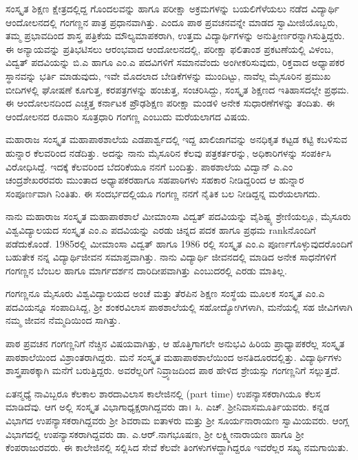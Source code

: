 {ಸಂಸ್ಕೃತ ಶಿಕ್ಷಣ ಕ್ಷೇತ್ರದಲ್ಲಿದ್ದ ಗೊಂದಲವನ್ನು ಹಾಗೂ ಪರೀಕ್ಷಾ ಅಕ್ರಮಗಳನ್ನು ಬಯಲಿಗೆಳೆಯಲು ನಡೆದ ವಿದ್ಯಾರ್ಥಿ ಆಂದೋಲನದಲ್ಲಿ ಗಂಗಣ್ಣನ ಪಾತ್ರ ಪ್ರಧಾನವಾಗಿತ್ತು. ಎಂದೂ ಪಾಠ  \enginline{-}  ಪ್ರವಚನ\-ವನ್ನೇ ಮಾಡದ ಸ್ವಾಮೀಜಿಯೊಬ್ಬರು, ತಮ್ಮ  ಪ್ರಭಾವದಿಂದ ಶಾಸ್ತ್ರ ಪತ್ರಿಕೆಯ ಮೌಲ್ಯಮಾಪಕರಾಗಿ, ಉತ್ತಮ ವಿದ್ಯಾರ್ಥಿಗಳನ್ನು ಅನುತ್ತೀರ್ಣರನ್ನಾಗಿಸುತ್ತಿದ್ದರು. 
\newpage
ಈ ಅನ್ಯಾಯವನ್ನು ಪ್ರತಿಭಟಿಸಲು ಆರಂಭವಾದ ಆಂದೋಲನದಲ್ಲಿ, ಪರೀಕ್ಷಾ ಫಲಿತಾಂಶ ಪ್ರಕಟಣೆಯಲ್ಲಿ ವಿಳಂಬ, ವಿದ್ವತ್ ಪದವಿಯನ್ನು ಬಿ.ಎ  ಹಾಗೂ  ಎಂ.ಎ ಪದವಿಗಳಿಗೆ ಸಮಾನವೆಂದು ಅಂಗೀಕರಿಸುವುದು, ರಿಕ್ತವಾದ ಅಧ್ಯಾಪಕರ ಸ್ಥಾನವನ್ನು  ಭರ್ತಿ ಮಾಡುವುದು, ಇವೇ ಮೊದಲಾದ ಬೇಡಿಕೆಗಳನ್ನು ಮುಂದಿಟ್ಟು, ನಾವೆಲ್ಲ ಮೈಸೂರಿನ ಪ್ರಮುಖ ಬೀದಿಗಳಲ್ಲಿ ಘೋಷಣೆ ಕೂಗುತ್ತ, ಕರಪತ್ರಗಳನ್ನು ಹಂಚುತ್ತ, ಸಂಚರಿಸಿದ್ದು, ಸಂಸ್ಕೃತ ಶಿಕ್ಷಣದ ಇತಿಹಾಸದಲ್ಲೇ ಪ್ರಥಮ. ಈ ಆಂದೋಲನದಿಂದ ಎಚ್ಚತ್ತ ಕರ್ನಾಟಕ ಪ್ರೌಢಶಿಕ್ಷಣ ಪರೀಕ್ಷಾ ಮಂಡಳಿ ಅನೇಕ ಸುಧಾರಣೆಗಳನ್ನು ತಂದಿತು. ಈ ಆಂದೋಲನದ ರೂವಾರಿ   \enginline{-}   ಸೂತ್ರಧಾರಿ ಗಂಗಣ್ಣ  ಎಂಬುದು ಮರೆಯಲಾಗದ ವಿಷಯ.

ಮಹಾರಾಜ ಸಂಸ್ಕೃತ ಮಹಾಪಾಠಶಾಲೆಯ ಎಡಪಾರ್ಶ್ವದಲ್ಲಿ ಇದ್ದ ಖಾಲಿಜಾಗವನ್ನು ಅನಧಿಕೃತ ಕಟ್ಟಡ ಕಟ್ಟಿ ಕಬಳಿಸುವ ಹುನ್ನಾರ ಕೆಲವರಿಂದ ನಡೆದಿತ್ತು. ಅದನ್ನು ನಾನು ಮೈಸೂರಿನ ಕೆಲವು  ಪತ್ರಕರ್ತರನ್ನು, ಅಧಿಕಾರಿಗಳನ್ನು ಸಂಪರ್ಕಿಸಿ ವಿರೋಧಿಸಿದ್ದೆ. ಇದಕ್ಕೆ ಕೆಲವರಿಂದ ಬೆದರಿಕೆಯೂ ನನಗೆ ಬಂದಿತ್ತು. ಪಾಠಶಾಲೆಯ ವಿದ್ವಾನ್ ಎ.ಎಂ ಚಂದ್ರಶೇಖರರವರು ಮುಂತಾದ ಅಧ್ಯಾಪಕರಹಾಗೂ ಸಹಪಾಠಿಗಳು ಸಹಕಾರ ನೀಡಿದ್ದರಿಂದ ಆ ಹುನ್ನಾರ ಸಂಪೂರ್ಣವಾಗಿ ನಿಂತಿತು. ಈ ಸಂದರ್ಭದಲ್ಲಿಯೂ ಗಂಗಣ್ಣ ನನಗೆ ನೈತಿಕ ಬಲ ನೀಡಿದ್ದನ್ನ ಮರೆಯಲಾಗದು.

ನಾನು ಮಹಾರಾಜ ಸಂಸ್ಕೃತ ಮಹಾಪಾಠಶಾಲೆ ಮೀಮಾಂಸಾ ವಿದ್ವತ್ ಪದವಿಯನ್ನು ವೈಶಿಷ್ಟ್ಯ ಶ್ರೇಣಿಯಲ್ಲೂ, ಮೈಸೂರು  ವಿಶ್ವವಿದ್ಯಾಲಯದ ಸಂಸ್ಕೃತ  ಎಂ.ಎ ಪದವಿಯನ್ನು ಎರಡು ಚಿನ್ನದ ಪದಕ ಹಾಗೂ ಪ್ರಥಮ  rankನೊಂದಿಗೆ ಪಡೆದುಕೊಂಡೆ. 1985ರಲ್ಲಿ ಮೀಮಾಂಸಾ ವಿದ್ವತ್ ಹಾಗೂ 1986 ರಲ್ಲಿ ಸಂಸ್ಕೃತ ಎಂ.ಎ ಪೂರ್ಣಗೊಳ್ಳುವುದರೊಂದಿಗೆ ಬಹುತೇಕ ನನ್ನ ವಿದ್ಯಾರ್ಥಿಜೀವನ ಸಮಾಪ್ತವಾಗಿತ್ತು. ನಾನು ವಿದ್ಯಾರ್ಥಿ ಜೀವನದಲ್ಲಿ ಮಾಡಿದ ಅನೇಕ ಸಾಧನೆಗಳಿಗೆ ಗಂಗಣ್ಣನ ಬೆಂಬಲ ಹಾಗೂ ಮಾರ್ಗದರ್ಶನ ದಾರಿದೀಪವಾಗಿತ್ತು ಎಂಬುದರಲ್ಲಿ ಎರಡು ಮಾತಿಲ್ಲ.

ಗಂಗಣ್ಣನೂ ಮೈಸೂರು ವಿಶ್ವವಿದ್ಯಾಲಯದ ಅಂಚೆ ಮತ್ತು ತೆರಪಿನ ಶಿಕ್ಷಣ ಸಂಸ್ಥೆಯ ಮೂಲಕ ಸಂಸ್ಕೃತ ಎಂ.ಎ ಪದವಿಯನ್ನೂ ಸಂಪಾದಿಸಿದ್ದ, ಶ್ರೀ ಶಂಕರವಿಲಾಸ ಪಾಠಶಾಲೆಯಲ್ಲಿ ಸಹೋದ್ಯೋಗಿಗಳಾಗಿ, ಮನೆಯಲ್ಲಿ ಸಹ ಜೀವಿಗಳಾಗಿ ನಮ್ಮ ಜೀವನ ನೆಮ್ಮದಿಯಿಂದ ಸಾಗಿತ್ತು.

ಪಾಠ  \enginline{-}  ಪ್ರವಚನ ಗಂಗಣ್ಣನಿಗೆ ನೆಚ್ಚಿನ ವಿಷಯವಾಗಿತ್ತು, ಆ ಹೊತ್ತಿಗಾಗಲೇ ಅನುಭವಿ  ಹಿರಿಯ ಪ್ರಾಧ್ಯಾಪಕರೆಲ್ಲ ಸಂಸ್ಕೃತ  ಪಾಠಶಾಲೆಯಿಂದ ವಿಶ್ರಾಂತರಾಗಿದ್ದರು. ಮನೆ ಸಂಸ್ಕೃತ ಮಹಾಪಾಠಶಾಲೆಯಿಂದ ಅನತಿದೂರದಲ್ಲಿತ್ತು. ವಿದ್ಯಾರ್ಥಿಗಳು ಶಾಸ್ತ್ರಪಾಠಕ್ಕಾಗಿ ಮನೆಗೆ ಬರುತ್ತಿದ್ದರು. ಅವರೆಲ್ಲರಿಗೆ ನಿವ್ರ್ಯಾಜದಿಂದ ಪಾಠ ಹೇಳಿದ ಶ್ರೇಯಸ್ಸು ಗಂಗಣ್ಣನಿಗೆ ಸಲ್ಲುತ್ತದೆ.

ಏತನ್ಮಧ್ಯೆ ನಾವಿಬ್ಬರೂ ಕೆಲಕಾಲ ಶಾರದಾವಿಲಾಸ ಕಾಲೇಜಿನಲ್ಲಿ (part  \enginline{-}  time) ಉಪನ್ಯಾಸಕರಾಗಿಯೂ ಕೆಲಸ ಮಾಡಿದೆವು. ಆಗ ಅಲ್ಲಿ ಸಂಸ್ಕೃತ ವಿಭಾಗಾಧ್ಯಕ್ಷರಾಗಿದ್ದವರು ಡಾ। ಸಿ. ಎಚ್. ಶ್ರೀನಿವಾಸಮೂರ್ತಿಯವರು. ಕನ್ನಡ ವಿಭಾಗದ ಉಪನ್ಯಾಸಕರಾಗಿದ್ದವರು ಶ್ರೀ ಶಿವರಾಮ ಐತಾಳರು ಮತ್ತು ಶ್ರೀ ಸೂರ್ಯನಾರಾಯಣ ಸ್ವಾಮಿಯವರು. ಆಂಗ್ಲ ವಿಭಾಗದಲ್ಲಿ ಉಪನ್ಯಾಸಕರಾಗಿದ್ದವರು ಡಾ. ಎ.ಆರ್.ನಾಗಭೂಷಣ, ಶ್ರೀ ಲಕ್ಷ್ಮೀನಾರಾಯಣ ಹಾಗೂ ಶ್ರೀ ಕೆಂಪರಾಜುರವರು. ಈ ಕಾಲೇಜಿನಲ್ಲಿ ಸಲ್ಲಿಸಿದ ಸೇವೆ ಕೆಲವೇ ತಿಂಗಳುಗಳದ್ದಾಗಿದ್ದರೂ ಇವರೆಲ್ಲರ ಸಖ್ಯ ನಮಗಾಯಿತು. 

}

